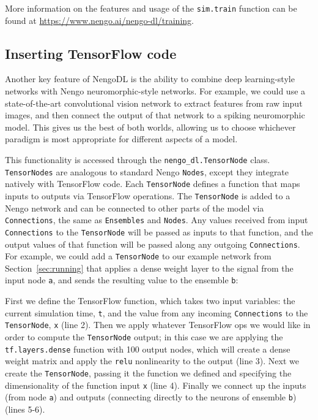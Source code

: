 \documentclass{article}
\begin{document}
More information on the features and usage of the \texttt{sim.train} function can be found at \url{https://www.nengo.ai/nengo-dl/training}.

\subsection{Inserting TensorFlow code}
\label{sec:tensornode}

Another key feature of NengoDL is the ability to combine deep learning-style networks with Nengo neuromorphic-style networks.  For example, we could use a state-of-the-art convolutional vision network to extract features from raw input images, and then connect the output of that network to a spiking neuromorphic model.  This gives us the best of both worlds, allowing us to choose whichever paradigm is most appropriate for different aspects of a model.

This functionality is accessed through the \texttt{nengo\_dl.TensorNode} class.  \texttt{TensorNodes} are analogous to standard Nengo \texttt{Nodes}, except they integrate natively with TensorFlow code.  Each \texttt{TensorNode} defines a function that maps inputs to outputs via TensorFlow operations.  The \texttt{TensorNode} is added to a Nengo network and can be connected to other parts of the model via \texttt{Connections}, the same as \texttt{Ensembles} and \texttt{Nodes}.  Any values received from input \texttt{Connections} to the \texttt{TensorNode} will be passed as inputs to that function, and the output values of that function will be passed along any outgoing \texttt{Connections}.  For example, we could add a \texttt{TensorNode} to our example network from Section~\ref{sec:running} that applies a dense weight layer to the signal from the input node \texttt{a}, and sends the resulting value to the ensemble \texttt{b}:



First we define the TensorFlow function, which takes two input variables: the current simulation time, \texttt{t}, and the value from any incoming \texttt{Connections} to the \texttt{TensorNode}, \texttt{x} (line 2).  Then we apply whatever TensorFlow ops we would like in order to compute the \texttt{TensorNode} output; in this case we are applying the \texttt{tf.layers.dense} function with 100 output nodes, which will create a dense weight matrix and apply the \texttt{relu} nonlinearity to the output (line 3).  Next we create the \texttt{TensorNode}, passing it the function we defined and specifying the dimensionality of the function input \texttt{x} (line 4).  Finally we connect up the inputs (from node \texttt{a}) and outputs (connecting directly to the neurons of ensemble \texttt{b}) (lines 5-6).
\end{document}
